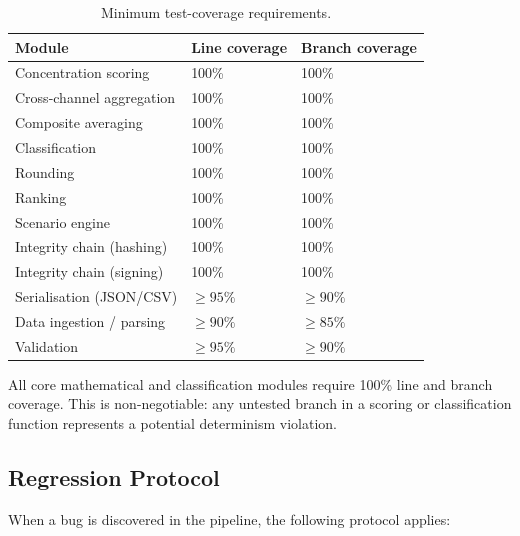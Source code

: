 \begin{table}[htbp]
  \centering\small
  \caption{Minimum test-coverage requirements.}\label{tab:test-coverage}
  \begin{tabular}{@{}l l l@{}}
    \toprule
    \textbf{Module} & \textbf{Line coverage} & \textbf{Branch coverage} \\
    \midrule
    Concentration scoring        & 100\% & 100\% \\
    Cross-channel aggregation    & 100\% & 100\% \\
    Composite averaging          & 100\% & 100\% \\
    Classification               & 100\% & 100\% \\
    Rounding                     & 100\% & 100\% \\
    Ranking                      & 100\% & 100\% \\
    Scenario engine              & 100\% & 100\% \\
    Integrity chain (hashing)    & 100\% & 100\% \\
    Integrity chain (signing)    & 100\% & 100\% \\
    Serialisation (JSON/CSV)     & \(\geq 95\%\) & \(\geq 90\%\) \\
    Data ingestion / parsing     & \(\geq 90\%\) & \(\geq 85\%\) \\
    Validation                   & \(\geq 95\%\) & \(\geq 90\%\) \\
    \bottomrule
  \end{tabular}
\end{table}

All core mathematical and classification modules require 100\% line and
branch coverage.  This is non-negotiable: any untested branch in a scoring
or classification function represents a potential determinism violation.

\subsection{Regression Protocol}\label{sec:test:regression}

When a bug is discovered in the pipeline, the following protocol applies:

